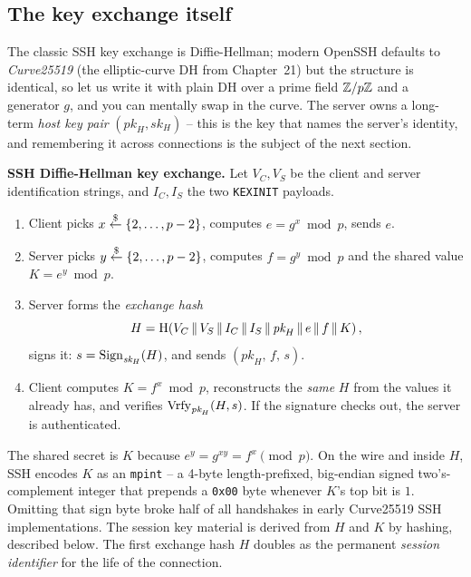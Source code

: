 \subsection{The key exchange itself}

The classic SSH key exchange is Diffie-Hellman; modern OpenSSH defaults to \emph{Curve25519} (the elliptic-curve DH from Chapter~21) but the structure is identical, so let us write it with plain DH over a prime field $\mathbb{Z}/p\mathbb{Z}$ and a generator $g$, and you can mentally swap in the curve. The server owns a long-term \emph{host key pair} $(\textit{pk}_H, \textit{sk}_H)$ -- this is the key that names the server's identity, and remembering it across connections is the subject of the next section.

\begin{formalbox}
\textbf{SSH Diffie-Hellman key exchange.} Let $V_C, V_S$ be the client and server identification strings, and $I_C, I_S$ the two \texttt{KEXINIT} payloads.
\begin{enumerate}
  \item Client picks $x \stackrel{\$}{\gets} \{2,\dots,p-2\}$, computes $e = g^{x} \bmod p$, sends $e$.
  \item Server picks $y \stackrel{\$}{\gets} \{2,\dots,p-2\}$, computes $f = g^{y} \bmod p$ and the shared value $K = e^{y} \bmod p$.
  \item Server forms the \emph{exchange hash}
  \[
    H = \operatorname{H}\!\left(V_C \,\|\, V_S \,\|\, I_C \,\|\, I_S \,\|\, \textit{pk}_H \,\|\, e \,\|\, f \,\|\, K\right),
  \]
  signs it: $s = \operatorname{Sign}_{\textit{sk}_H}(H)$, and sends $(\textit{pk}_H,\, f,\, s)$.
  \item Client computes $K = f^{x} \bmod p$, reconstructs the \emph{same} $H$ from the values it already has, and verifies $\operatorname{Vrfy}_{\textit{pk}_H}(H, s)$. If the signature checks out, the server is authenticated.
\end{enumerate}
The shared secret is $K$ because $e^{y} = g^{xy} = f^{x} \pmod p$. On the wire and inside $H$, SSH encodes $K$ as an \texttt{mpint} -- a 4-byte length-prefixed, big-endian signed two's-complement integer that prepends a \texttt{0x00} byte whenever $K$'s top bit is $1$. Omitting that sign byte broke half of all handshakes in early Curve25519 SSH implementations. The session key material is derived from $H$ and $K$ by hashing, described below. The first exchange hash $H$ doubles as the permanent \emph{session identifier} for the life of the connection.
\end{formalbox}

